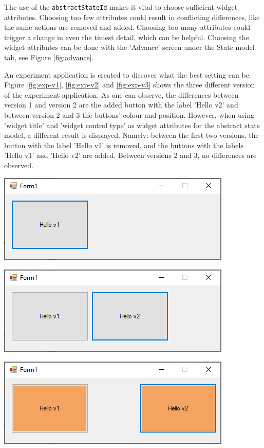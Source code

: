 The use of the \verb|abstractStateId| makes it vital to choose sufficient widget attributes. Choosing too few attributes could result in conflicting differences, like the same actions are removed and added. Choosing too many attributes could trigger a change in even the tiniest detail, which can be helpful. Choosing the widget attributes can be done with the 'Advance' screen under the State model tab, see Figure \ref{fig:advance}.

An experiment application is created to discover what the best setting can be. Figure \ref{fig:exp-v1}, \ref{fig:exp-v2} and \ref{fig:exp-v3} shows the three different version of the experiment application. As one can observe, the differences between version 1 and version 2 are the added button with the label 'Hello v2' and between version 2 and 3 the buttons' colour and position. However, when using 'widget title' and 'widget control type' as widget attributes for the abstract state model, a different result is displayed. Namely: between the first two versions, the button with the label 'Hello v1' is removed, and the buttons with the labels 'Hello v1' and 'Hello v2' are added. Between versions 2 and 3, no differences are observed.

\begingroup
\captionsetup{type=figure}
\includegraphics[scale=1]{pics/exp-v1.png}
\label{fig:exp-v1}
\endgroup

\begingroup
\captionsetup{type=figure}
\includegraphics[scale=1]{pics/exp-v2.png}
\label{fig:exp-v2}
\endgroup

\begingroup
\captionsetup{type=figure}
\includegraphics[scale=1]{pics/exp-v3.png}
\label{fig:exp-v3}
\endgroup

